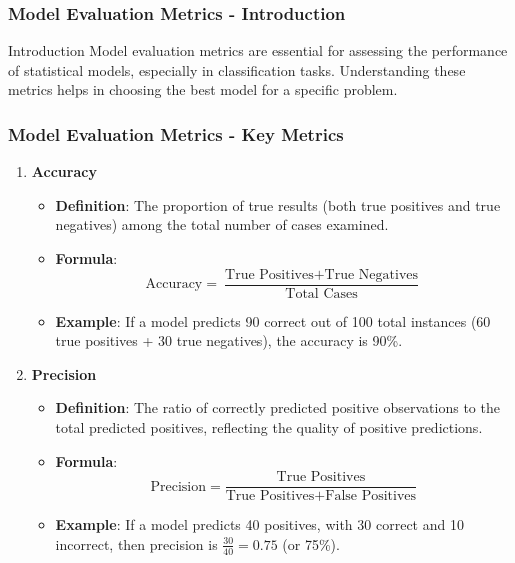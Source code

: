 \documentclass{beamer}
\begin{document}
\begin{frame}[fragile]
    \frametitle{Model Evaluation Metrics - Introduction}
    \begin{block}{Introduction}
        Model evaluation metrics are essential for assessing the performance of statistical models, especially in classification tasks. 
        Understanding these metrics helps in choosing the best model for a specific problem.
    \end{block}
\end{frame}

\begin{frame}[fragile]
    \frametitle{Model Evaluation Metrics - Key Metrics}
    \begin{enumerate}
        \item \textbf{Accuracy}
        \begin{itemize}
            \item \textbf{Definition}: The proportion of true results (both true positives and true negatives) among the total number of cases examined.
            \item \textbf{Formula}: 
            \begin{equation}
            \text{Accuracy} = \frac{\text{True Positives} + \text{True Negatives}}{\text{Total Cases}}
            \end{equation}
            \item \textbf{Example}: If a model predicts 90 correct out of 100 total instances (60 true positives + 30 true negatives), the accuracy is 90\%.
        \end{itemize}

        \item \textbf{Precision}
        \begin{itemize}
            \item \textbf{Definition}: The ratio of correctly predicted positive observations to the total predicted positives, reflecting the quality of positive predictions.
            \item \textbf{Formula}: 
            \begin{equation}
            \text{Precision} = \frac{\text{True Positives}}{\text{True Positives} + \text{False Positives}}
            \end{equation}
            \item \textbf{Example}: If a model predicts 40 positives, with 30 correct and 10 incorrect, then precision is \( \frac{30}{40} = 0.75 \) (or 75\%).
        \end{itemize}
    \end{enumerate}
\end{frame}
\end{document}
